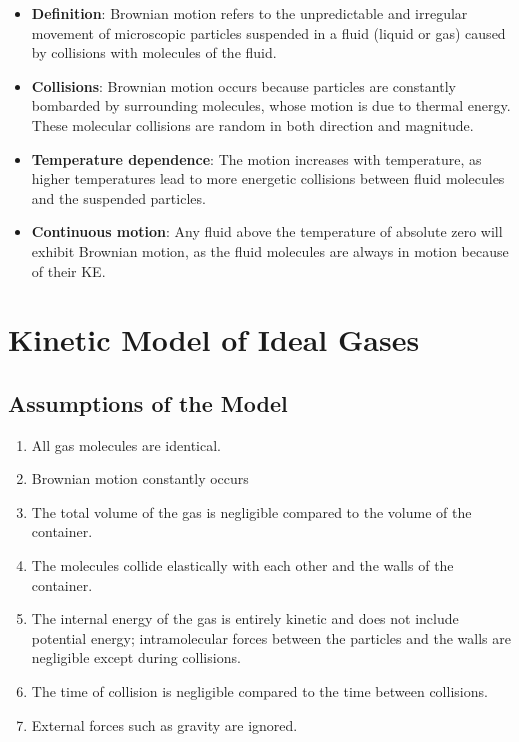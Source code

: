 \documentclass[a4paper,12pt]{article}
\let\oldsection\section
\renewcommand\section{\clearpage\oldsection}
\begin{document}
\begin{itemize}
  \item \textbf{Definition}: Brownian motion refers to the unpredictable and irregular movement of microscopic particles suspended in a fluid (liquid or gas) caused by collisions with molecules of the fluid.
  \item \textbf{Collisions}: Brownian motion occurs because particles are constantly bombarded by surrounding molecules, whose motion is due to thermal energy. These molecular collisions are random in both direction and magnitude.
  \item \textbf{Temperature dependence}: The motion increases with temperature, as higher temperatures lead to more energetic collisions between fluid molecules and the suspended particles.
  \item \textbf{Continuous motion}: Any fluid above the temperature of absolute zero will exhibit Brownian motion, as the fluid molecules are always in motion because of their KE.
\end{itemize}

\section{Kinetic Model of Ideal Gases}

\subsection{Assumptions of the Model}

\begin{enumerate}
  \item All gas molecules are identical.
  \item Brownian motion constantly occurs
  \item The total volume of the gas is negligible compared to the volume of the container.
  \item The molecules collide elastically with each other and the walls of the container.
  \item The internal energy of the gas is entirely kinetic and does not include potential energy; intramolecular forces between the particles and the walls are negligible except during collisions.
  \item The time of collision is negligible compared to the time between collisions.
  \item External forces such as gravity are ignored.
\end{enumerate}
\end{document}

